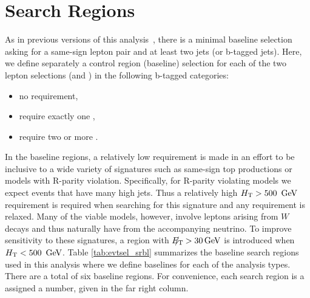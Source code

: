 \section{Search Regions}
\label{sec:evtsel_sr}
As in previous versions of this
analysis~\cite{an_ssb2011,an_ssb2012,an_ssb2012hcp}, there is a minimal
baseline selection asking for a same-sign lepton pair and at least two jets
(or b-tagged jets). Here, we define separately a control region (baseline)
selection for each of the two lepton selections (\hpt and \lpt) in the
following b-tagged categories:
\begin{itemize}
\item no \bj requirement,
\item require exactly one \bj,
\item require two or more \bjs.
\end{itemize}
In the baseline regions, a relatively low \met requirement is made in an
effort to be inclusive to a wide variety of signatures such as same-sign top
productions or models with R-parity violation. Specifically, for R-parity
violating models we expect events that have many high \pt jets. Thus a
relatively high $\Ht>500\ \GeV$ requirement is required when searching for
this signature and any \met requirement is relaxed. Many of the viable models,
however, involve leptons arising from $W$ decays and thus naturally have \met
from the accompanying neutrino. To improve sensitivity to these signatures,
a region with $E_{\mathrm{T}}\hspace{-1.0em}/\kern0.45em > 30 \,\text{Ge\hspace{-.08em}V}$ is introduced when $H_{\mathrm{T}}<500\ \,\text{Ge\hspace{-.08em}V}$. Table
\ref{tab:evtsel_srbl} summarizes the baseline search regions used in this
analysis where we define baselines for each of the analysis types. There are
a total of six baseline regions. For convenience, each search region is a
assigned a number, given in the far right column.

